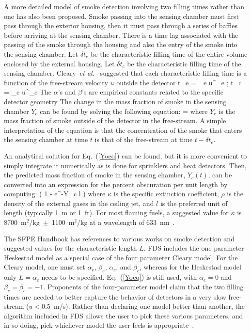 \documentclass[11pt]{book}
\begin{document}
A more detailed model of smoke detection involving two filling times rather than one has also been proposed.
Smoke passing into the sensing chamber must first pass through the exterior housing, then it must pass through a series
of baffles before arriving at the sensing chamber. There is a time lag
associated with the passing of the smoke through the housing and also the entry of the smoke into the sensing chamber.
Let $\delta t_e$ be the characteristic filling time of the entire volume enclosed by the external housing. Let
$\delta t_c$ be the characteristic filling time of the sensing chamber.
Cleary~{\em et al.}~\cite{Cleary:IAFSS6} suggested that each characteristic filling time is a function of the
free-stream velocity $u$ outside the detector
\be
\delta t_e = \alpha_e u^{\beta_e} \quad ; \quad \delta t_c = \alpha_c u^{\beta_c}
\ee
The $\alpha$'s and $\beta$'s are empirical constants related to the specific detector geometry
The change in the mass fraction of smoke in the sensing chamber $Y_c$ can be found by solving the following equation:
\be
{} =  \label{Yoeq}
\ee
where $Y_e$ is the mass fraction of smoke outside of the detector in the free-stream.
A simple interpretation of the equation is that the concentration of the smoke that enters the sensing chamber at time $t$
is that of the free-stream at time $t-\delta t_e$.

An analytical solution for Eq.~(\ref{Yoeq}) can be found, but it is more convenient to simply integrate it numerically
as is done for sprinklers and heat detectors. Then, the predicted mass fraction of smoke in the sensing chamber,
$Y_c(t)$, can be converted into an expression for the percent obscuration per unit length by computing:
\be
\left( 1 - e^{-\kappa \rho Y_c l} \right) 
\ee
where $\kappa$ is the specific extinction coefficient, $\rho$ is the density of the external gases in the ceiling jet,
and $l$ is the preferred unit of length (typically 1~m or 1~ft).
For most flaming fuels, a suggested value for $\kappa$ is 8700~m$^2$/kg~$\pm$~1100~m$^2$/kg at a
wavelength of 633~nm~\cite{Mulholland:F+M}.

The SFPE Handbook has references to various works on smoke detection and suggested values for the
characteristic length $L$. FDS includes the one parameter Heskestad model as a special case of the four parameter
Cleary model. For the Cleary model, one must set
$\alpha_e$, $\beta_e$, $\alpha_c$, and $\beta_c$, whereas for the Heskestad model only $L=\alpha_c$ needs to be
specified. Eq.~(\ref{Yoeq})
is still used, with $\alpha_e=0$ and $\beta_e=\beta_c=-1$.
Proponents of the four-parameter model claim that the two filling times are needed to
better capture the behavior of detectors in a very
slow free-stream ($u<0.5$~m/s). Rather than declaring one model better than another,
the algorithm included in FDS allows the
user to pick these various parameters, and in so doing, pick whichever model the user feels is appropriate~\cite{CSE_GCR}.
\end{document}
